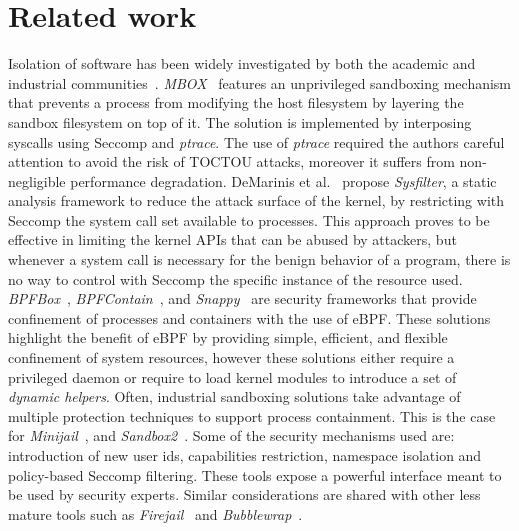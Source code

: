 \section{Related work}
\label{natisand:rel_works}

Isolation of software has been widely investigated by both the academic
and industrial communities~\cite{berman1995tron, kim2013practical,
  demarinis2020sysfilter, minijail, sandbox2, firejail,
  bubblewrap,seapp,enhance-wasm-sandbox}.  {\em MBOX}~\cite{
  kim2013practical} features an unprivileged sandboxing mechanism that
prevents a process from modifying the host filesystem by layering the
sandbox filesystem on top of it. The solution is implemented by
interposing syscalls using Seccomp and {\em ptrace}. The use of {\em
  ptrace} required the authors careful attention to avoid the risk of
TOCTOU attacks, moreover it suffers from non-negligible performance
degradation. DeMarinis et al.~\cite{demarinis2020sysfilter} propose
{\em Sysfilter}, a static analysis framework to reduce the attack
surface of the kernel, by restricting with Seccomp the system call set
available to processes.  This approach proves to be effective in
limiting the kernel APIs that can be abused by attackers, but whenever
a system call is necessary for the benign behavior of a program, there
is no way to control with Seccomp the specific instance of the
resource used. {\em BPFBox}~\cite{ findlay2020bpfbox}, {\em
  BPFContain}~\cite{findlay2021bpfcontain}, and {\em
  Snappy}~\cite{belair2021snappy} are security frameworks that provide
confinement of processes and containers with the use of eBPF.  These
solutions highlight the benefit of eBPF by providing simple, efficient,
and flexible confinement of system resources, however these solutions
either require a privileged daemon or require to load kernel modules
to introduce a set of {\em dynamic helpers}.   Often,
industrial sandboxing solutions take advantage of multiple protection
techniques to support process containment. This is the case for {\em
  Minijail}~\cite{minijail}, and {\em Sandbox2}~\cite{ sandbox2}. Some
of the security mechanisms used are: introduction of new user ids,
capabilities restriction, namespace isolation and policy-based Seccomp
filtering. These tools expose a powerful interface meant
to be used by security experts. Similar considerations are shared with
other less mature tools such as {\em Firejail}~\cite{ firejail} and
{\em Bubblewrap}~\cite{bubblewrap}.

